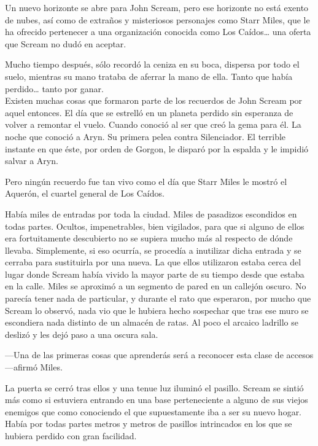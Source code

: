 \begin{prev}
    Un nuevo horizonte se abre para John Scream, pero ese horizonte no está exento de nubes, así como de extraños y misteriosos personajes como Starr Miles, que le ha ofrecido pertenecer a una organización conocida como Los Caídos\dots{} una oferta que Scream no dudó en aceptar.
\end{prev}

\noindent{}Mucho tiempo después, sólo recordó la ceniza en su boca, dispersa por todo el suelo, mientras su mano trataba de aferrar la mano de ella. Tanto que había perdido\dots{} tanto por ganar.\\

\noindent{}Existen muchas cosas que formaron parte de los recuerdos de John Scream por aquel entonces. El día que se estrelló en un planeta perdido sin esperanza de volver a remontar el vuelo. Cuando conoció al ser que creó la gema para él. La noche que conoció a Aryn. Su primera pelea contra Silenciador. El terrible instante en que éste, por orden de Gorgon, le disparó por la espalda y le impidió salvar a Aryn.

Pero ningún recuerdo fue tan vivo como el día que Starr Miles le mostró el Aquerón, el cuartel general de Los Caídos.

Había miles de entradas por toda la ciudad. Miles de pasadizos escondidos en todas partes. Ocultos, impenetrables, bien vigilados, para que si alguno de ellos era fortuitamente descubierto no se supiera mucho más al respecto de dónde llevaba. Simplemente, si eso ocurría, se procedía a inutilizar dicha entrada y se cerraba para sustituirla por una nueva. La que ellos utilizaron estaba cerca del lugar donde Scream había vivido la mayor parte de su tiempo desde que estaba en la calle. Miles se aproximó a un segmento de pared en un callejón oscuro. No parecía tener nada de particular, y durante el rato que esperaron, por mucho que Scream lo observó, nada vio que le hubiera hecho sospechar que tras ese muro se escondiera nada distinto de un almacén de ratas. Al poco el arcaico ladrillo se deslizó y les dejó paso a una oscura sala.

---Una de las primeras cosas que aprenderás será a reconocer esta clase de accesos ---afirmó Miles.

La puerta se cerró tras ellos y una tenue luz iluminó el pasillo. Scream se sintió más como si estuviera entrando en una base perteneciente a alguno de sus viejos enemigos que como conociendo el que supuestamente iba a ser su nuevo hogar. Había por todas partes metros y metros de pasillos intrincados en los que se hubiera perdido con gran facilidad.

